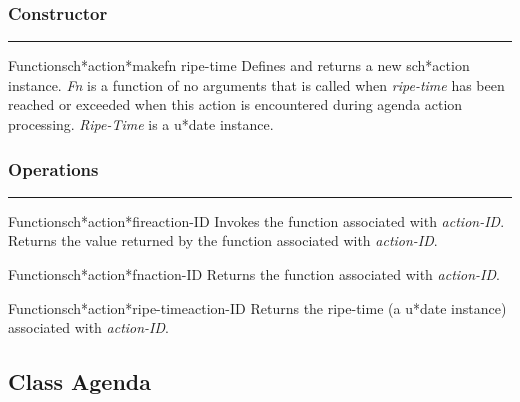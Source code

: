 \subsubsection*{Constructor}
\par\vspace*{0.00in}\par\hrule\par\medskip\par


\begin{functiondoc}{Function}{sch*action*make}{fn ripe-time}
Defines and returns a new sch*action instance.
{\em Fn} is a function of no arguments that is called when {\em ripe-time} has been reached
or exceeded when this action is encountered during agenda action processing. 
{\em Ripe-Time} is a u*date instance.
\end{functiondoc}


\subsubsection*{Operations}
\par\vspace*{0.00in}\par\hrule\par\medskip\par


\begin{functiondoc}{Function}{sch*action*fire}{action-ID}
Invokes the function associated with {\em action-ID}.
Returns the value returned by the function associated with {\em action-ID}.
\end{functiondoc}

\begin{functiondoc}{Function}{sch*action*fn}{action-ID}
Returns the function associated with {\em action-ID}.
\end{functiondoc}

\begin{functiondoc}{Function}{sch*action*ripe-time}{action-ID}
Returns the ripe-time (a u*date instance) associated with {\em action-ID}.
\end{functiondoc}


\clearpage

\subsection{Class Agenda}

